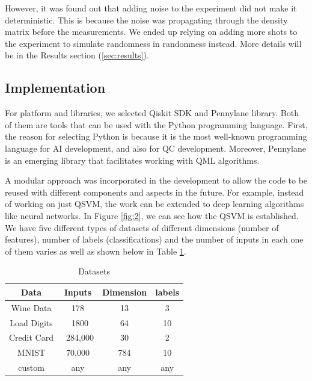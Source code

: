 \documentclass[12pt,a4paper]{article}
\begin{document}
	However, it was found out that adding noise to the experiment did not make it deterministic. This is because the noise was propagating through the density matrix before the measurements. We ended up relying on adding more shots to the experiment to simulate randomness in randomness instead. More details will be in the Results section (\ref{sec:results}).
	
	\subsection{Implementation}
	\label{sec:implementation}
	
	For platform and libraries, we selected Qiskit SDK and Pennylane library. Both of them are tools that can be used with the Python programming language. First, the reason for selecting Python is because it is the most well-known programming language for AI development, and also for QC development. Moreover, Pennylane is an emerging library that facilitates working with QML algorithms.
	
	A modular approach was incorporated in the development to allow the code to be reused with different components and aspects in the future. For example, instead of working on just QSVM, the work can be extended to deep learning algorithms like neural networks. In Figure \ref{fig:2}, we can see how the QSVM is established. We have five different types of datasets of different dimensions (number of features), number of labels (classifications) and the number of inputs in each one of them varies as well as shown below in Table \ref{tab:Datasets}.
	
	\begin{table}[h!]
		\centering
		\begin{tabular}{|c|c|c|c|}
			\hline
			\textbf{Data} & \textbf{Inputs} & \textbf{Dimension} & \textbf{labels}\\ \hline
			Wine Data             & 178            & 13      & 3              \\ \hline
			Load Digits            & ~1800             &64        & 10          \\ \hline
			Credit Card           & ~284,000             &30           & 2       \\ \hline
			MNIST               & 70,000             & 784         & 10        \\ \hline
			custom               & any              & any          & any      \\ \hline
		\end{tabular}
		\caption{Datasets}
		\label{tab:Datasets}
	\end{table}
	
\end{document}
